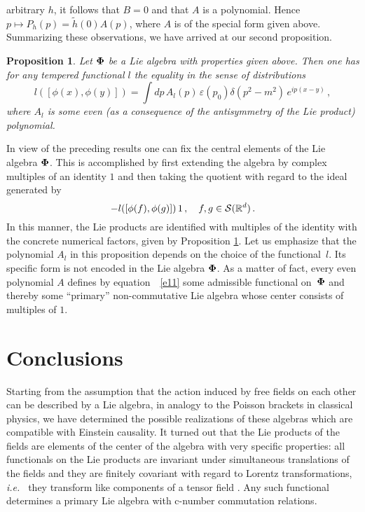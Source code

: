 \documentclass[11pt]{article}
\newtheorem{proposition}[theorem]{Proposition}
\def\RR{\mathbb{R}}
\def\cS{{\cal S}}
\def\bPhi{\mbox{\boldmath $\Phi$}}
\def\ie{\textit{i.e.~}}
\def\be{\begin{equation}}
\def\ee{\end{equation}}
\begin{document}
arbitrary $h$, it follows 
that $B=0$ and that $A$ is a polynomial. Hence
$p \mapsto P_h(p) = \widetilde{h}(0) A(p)$, where $A$ is of the special 
form given above. Summarizing these
observations, we have arrived at our second proposition.
\begin{proposition} \label{p2}
  Let $\bPhi$ be a Lie algebra with properties given above. Then
  one has for any tempered functional $l$ the equality in the
  sense of distributions
  \be \label{e11}
  l([\phi(x), \phi(y)]) =
  \int \! dp \, A_l(p) \, \varepsilon(p_0)
\delta(p^2 - m^2) \, e^{ip(x-y)} \, ,
\ee
where $A_l$ is some even (as a consequence of the
antisymmetry of the Lie product) polynomial.
\end{proposition}  

In view of the preceding results one can fix the central elements of
the Lie algebra $\bPhi$. This is accomplished by first extending the 
algebra by complex multiples of an identity $1$ and then taking the quotient
with regard to the ideal generated by
\be
   [\phi(f), \phi(g)] - l([\phi(f), \phi(g)]) \, 1 \, , \quad 
   f,g \in \cS(\RR^d) \, .
\ee
In this manner, the Lie products
are identified with multiples of the identity
with the concrete numerical factors, given by 
Proposition \ref{p2}.
Let us emphasize that the polynomial $A_l$ in this proposition 
depends on the choice of the functional~$l$. 
Its specific form is not
encoded in the Lie algebra $\bPhi$. As a matter of fact, every even
polynomial $A$ defines by equation~~\eqref{e11} some admissible functional
on~$\bPhi$ and thereby some ``primary'' non-commutative Lie algebra
whose center consists of multiples of $1$. 

\section{Conclusions}
Starting from the assumption that the action induced by free fields on
each other can be described by a Lie algebra, in analogy to the Poisson
brackets in classical physics, we have determined the possible
realizations of these algebras which are compatible with Einstein
causality. It turned out that the Lie products of the fields are
elements of the center of the algebra with very specific
properties: all functionals on the Lie products 
are invariant under simultaneous translations of the fields and
they are finitely covariant with regard to Lorentz transformations, \ie
they transform like components of a tensor field \cite{BrEpGl}.
Any such functional determines a primary Lie algebra with c-number
commutation relations.
\end{document}
